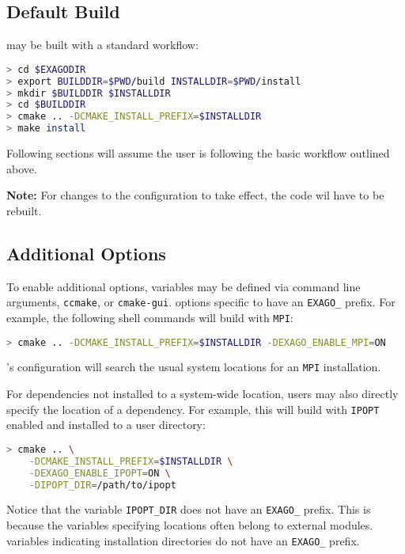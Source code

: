\subsection{Default Build}

\exago may be built with a standard \cmake workflow:

\begin{lstlisting}[language=bash,caption={Example \cmake workflow}]
> cd $EXAGODIR
> export BUILDDIR=$PWD/build INSTALLDIR=$PWD/install
> mkdir $BUILDDIR $INSTALLDIR
> cd $BUILDDIR
> cmake .. -DCMAKE_INSTALL_PREFIX=$INSTALLDIR
> make install
\end{lstlisting}

Following sections will assume the user is following the basic workflow outlined above.

\textbf{Note:} For changes to the \cmake configuration to take effect, the code wil have to be rebuilt.

\subsection{Additional Options}

To enable additional options, \cmake variables may be defined via \cmake command line arguments, \texttt{ccmake}, or \texttt{cmake-gui}.
\cmake options specific to \exago have an \texttt{EXAGO\_} prefix.
For example, the following shell commands will build \exago with \texttt{MPI}:

\begin{lstlisting}[language=bash]
> cmake .. -DCMAKE_INSTALL_PREFIX=$INSTALLDIR -DEXAGO_ENABLE_MPI=ON
\end{lstlisting}

\exago's \cmake configuration will search the usual system locations for an \texttt{MPI} installation.

For dependencies not installed to a system-wide location, users may also directly specify the location of a dependency.
For example, this will build \exago with \texttt{IPOPT} enabled and installed to a user directory:

\begin{lstlisting}[language=bash]
> cmake .. \
    -DCMAKE_INSTALL_PREFIX=$INSTALLDIR \
    -DEXAGO_ENABLE_IPOPT=ON \
    -DIPOPT_DIR=/path/to/ipopt
\end{lstlisting}

Notice that the \cmake variable \texttt{IPOPT\_DIR} does not have an \texttt{EXAGO\_} prefix.
This is because the variables specifying locations often belong to external \cmake modules.
\cmake variables indicating installation directories do not have an \texttt{EXAGO\_} prefix.

